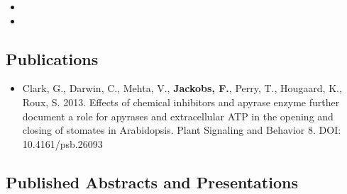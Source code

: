 \documentclass[10pt,letterpaper,sans]{moderncv}        %
\begin{document}
\begin{itemize}
\item{}


\vspace{6pt}

\item{}

\end{itemize}

\vspace{2pt}

\subsection{Publications}

\vspace{5pt}

\begin{itemize}

\item{\small{Clark, G., Darwin, C., Mehta, V., \textbf{Jackobs, F.}, Perry, T., Hougaard, K., Roux, S. 2013. Effects of chemical inhibitors and apyrase enzyme further document a role for apyrases and extracellular ATP in the opening and closing of stomates in Arabidopsis. Plant Signaling and Behavior 8. DOI: 10.4161/psb.26093}}


\end{itemize}

\vspace{2pt}

\subsection{Published Abstracts and Presentations}

\vspace{5pt}
\end{document}
